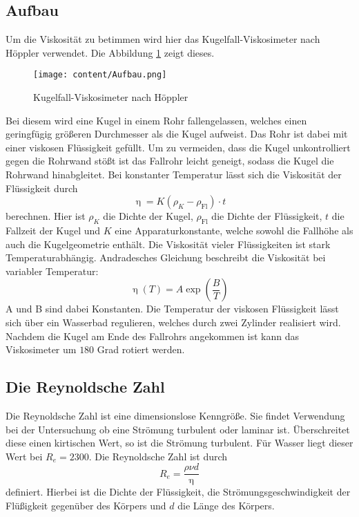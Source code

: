 \subsection{Aufbau}
Um die Viskosität zu betimmen wird hier das Kugelfall-Viskosimeter nach Höppler verwendet.
Die Abbildung \ref{fig:aufbau} zeigt dieses.
\begin{figure}
  \centering
  \texttt{[image: content/Aufbau.png]}
  \caption{Kugelfall-Viskosimeter nach Höppler\cite{v107}}
  \label{fig:aufbau}
\end{figure}
Bei diesem wird eine Kugel in einem Rohr fallengelassen, welches einen geringfügig größeren Durchmesser als die Kugel aufweist.
Das Rohr ist dabei mit einer viskosen Flüssigkeit gefüllt.
Um zu vermeiden, dass die Kugel unkontrolliert gegen die Rohrwand stößt ist das Fallrohr leicht geneigt, sodass die Kugel die Rohrwand hinabgleitet.
Bei konstanter Temperatur lässt sich die Viskosität der Flüssigkeit durch
\begin{equation}
  \upeta = K (\rho_K -\rho_\text{Fl}) \cdot t
\end{equation}
 berechnen.
Hier ist $\rho_K$ die Dichte der Kugel, $\rho_\text{Fl}$ die Dichte der Flüssigkeit, $t$ die Fallzeit der Kugel und $K$ eine Apparaturkonstante, welche sowohl die Fallhöhe als auch die Kugelgeometrie enthält.
Die Viskosität vieler Flüssigkeiten ist stark Temperaturabhängig.
Andradesches Gleichung beschreibt die Viskosität bei variabler Temperatur:
\begin{equation}
  \label{eq:and}
  \upeta (T)= A \exp(\frac{B}{T})
\end{equation}
A und B sind dabei Konstanten.
Die Temperatur der viskosen Flüssigkeit lässt sich über ein Wasserbad regulieren, welches durch zwei Zylinder realisiert wird.
Nachdem die Kugel am Ende des Fallrohrs angekommen ist kann das Viskosimeter um $180$ Grad rotiert werden.
\subsection{Die Reynoldsche Zahl}
Die Reynoldsche Zahl ist eine dimensionslose Kenngröße.
Sie findet Verwendung bei der Untersuchung ob eine Strömung turbulent oder laminar ist.
Überschreitet diese einen kirtischen Wert, so ist die Strömung turbulent.
Für Wasser liegt dieser Wert bei $R_e=2300$\cite{ström}.
Die Reynoldsche Zahl ist durch
\begin{equation}
  R_e = \frac{\rho \nu d}{\upeta}
    \label{eqn:rey}
\end{equation}
definiert.
Hierbei ist \rho die Dichte der Flüssigkeit, \nu die Strömungsgeschwindigkeit der Flüßigkeit gegenüber des Körpers und $d$ die Länge des Körpers.
